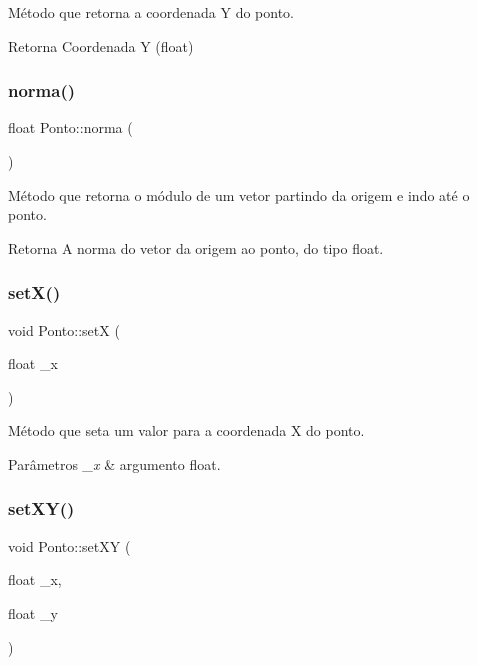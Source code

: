Método que retorna a coordenada Y do ponto. 

\begin{DoxyReturn}{Retorna}
Coordenada Y (float) 
\end{DoxyReturn}
\mbox{\label{classPonto_a9b0ddbdddd05edbc4d45ef0671a628c6}} 
\subsubsection{\texorpdfstring{norma()}{norma()}}
{\footnotesize\ttfamily float Ponto\+::norma (\begin{DoxyParamCaption}{ }\end{DoxyParamCaption})\hspace{0.3cm}{\ttfamily [inline]}}



Método que retorna o módulo de um vetor partindo da origem e indo até o ponto. 

\begin{DoxyReturn}{Retorna}
A norma do vetor da origem ao ponto, do tipo float. 
\end{DoxyReturn}
\mbox{\label{classPonto_a22129ad4dbf8019c479021d70a9f6774}} 
\subsubsection{\texorpdfstring{set\+X()}{setX()}}
{\footnotesize\ttfamily void Ponto\+::setX (\begin{DoxyParamCaption}\item[{float}]{\+\_\+x }\end{DoxyParamCaption})\hspace{0.3cm}{\ttfamily [inline]}}



Método que seta um valor para a coordenada X do ponto. 


\begin{DoxyParams}{Parâmetros}
{\em \+\_\+x} & argumento float. \\
\hline
\end{DoxyParams}
\mbox{\label{classPonto_a827488219a7da184d440f687cec49ce6}} 
\subsubsection{\texorpdfstring{set\+X\+Y()}{setXY()}}
{\footnotesize\ttfamily void Ponto\+::set\+XY (\begin{DoxyParamCaption}\item[{float}]{\+\_\+x,  }\item[{float}]{\+\_\+y }\end{DoxyParamCaption})\hspace{0.3cm}{\ttfamily [inline]}}



